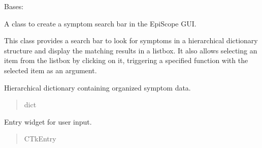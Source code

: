 \documentclass[letterpaper,10pt,english]{sphinxmanual}
\begin{document}
\begin{fulllineitems}
\label{\detokenize{annotation:annotation.search_bar.search_symptomes}}
\pysigstartsignatures
{}
\pysigstopsignatures
\sphinxAtStartPar
Bases: 

\sphinxAtStartPar
A class to create a symptom search bar in the EpiScope GUI.

\sphinxAtStartPar
This class provides a search bar to look for symptoms in a hierarchical dictionary structure
and display the matching results in a listbox. It also allows selecting an item from the listbox
by clicking on it, triggering a specified function with the selected item as an argument.

\begin{fulllineitems}
\label{\detokenize{annotation:annotation.search_bar.search_symptomes.symptoms_structure}}
\pysigstartsignatures
{}
\pysigstopsignatures
\sphinxAtStartPar
Hierarchical dictionary containing organized symptom data.
\begin{quote}\begin{description}
\sphinxAtStartPar
dict

\end{description}\end{quote}

\end{fulllineitems}


\begin{fulllineitems}
\label{\detokenize{annotation:annotation.search_bar.search_symptomes.search_entry}}
\pysigstartsignatures
{}
\pysigstopsignatures
\sphinxAtStartPar
Entry widget for user input.
\begin{quote}\begin{description}
\sphinxAtStartPar
CTkEntry


\end{description}
\end{quote}
\end{fulllineitems}
\end{fulllineitems}
\end{document}
